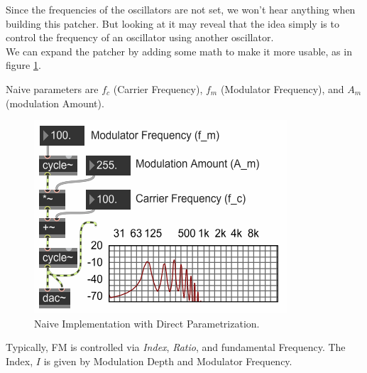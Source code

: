 Since the frequencies of the oscillators are not set, we won't hear anything when building this patcher. But looking at it may reveal that the idea simply is to control the frequency of an oscillator using another oscillator.\\
We can expand the patcher by adding some math to make it more usable, as in figure \ref{fig:fmNaive}.

Naive parameters are ${f_c}$ (Carrier Frequency), ${f_m}$ (Modulator Frequency), and ${A_m}$ (modulation Amount).

\begin{figure}[H]
	\begin{center}
		\includegraphics{img/FMnaive.png}
		\caption{Naive Implementation with Direct Parametrization.}
		\label{fig:fmNaive}
	\end{center}
\end{figure}



Typically, FM is controlled via \textit{Index}, \textit{Ratio}, and fundamental Frequency.
The Index, ${I}$ is given by Modulation Depth and Modulator Frequency.



